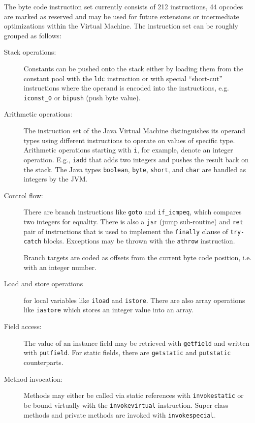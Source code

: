 \documentclass[12pt,twoside]{article}
\newcommand\cp{{constant pool }}
\newcommand\jvm{{Java Virtual Machine }}
\begin{document}
The byte code instruction  set currently consists of 212 instructions,
44  opcodes  are  marked  as  reserved  and may  be  used  for  future
extensions   or   intermediate   optimizations  within   the   Virtual
Machine. The instruction set can be roughly grouped as follows:

\begin{description}
\item[Stack operations:] Constants can be pushed onto the stack either
by loading them from the \cp with the \texttt{ldc} instruction or with
special ``short-cut''  instructions where the operand  is encoded into
the  instructions, e.g.   \texttt{iconst\_0} or  \texttt{bipush} (push
byte value).

\item[Arithmetic  operations:]   The  instruction  set   of  the  \jvm
distinguishes  its  operand  types  using  different  instructions  to
operate on  values of  specific type.  Arithmetic  operations starting
with  \texttt{i}, for  example,  denote  an  integer  operation.  E.g.,
\texttt{iadd} that adds two integers and pushes the result back on the
stack.     The    Java    types    \texttt{boolean},    \texttt{byte},
\texttt{short}, and \texttt{char} are handled as integers by the JVM.

\item[Control flow:] There  are branch instructions like \texttt{goto}
and   \texttt{if\_icmpeq},    which   compares   two    integers   for
equality.  There  is  also   a  \texttt{jsr}  (jump  sub-routine)  and
\texttt{ret} pair of instructions that  is  used to implement the
\texttt{finally} clause of  \texttt{try-catch} blocks.  Exceptions may
be thrown with the \texttt{athrow} instruction.

Branch  targets  are coded  as  offsets  from  the current  byte  code
position, i.e. with an integer number.

\item[Load   and   store operations]    for   local   variables   like
\texttt{iload} and  \texttt{istore}.  There are also  array operations
like \texttt{iastore} which stores an integer value into an array.

\item[Field access:] The  value of an instance field  may be retrieved
with \texttt{getfield} and written with \texttt{putfield}.  For static
fields,   there    are   \texttt{getstatic}   and   \texttt{putstatic}
counterparts.

\item[Method  invocation:] Methods  may  either be  called via  static
references with \texttt{invokesta\-tic} or be bound virtually with the
\texttt{invokevirtual}  instruction. Super  class methods  and private
methods are invoked with \texttt{invokespecial}.


\end{description}
\end{document}
